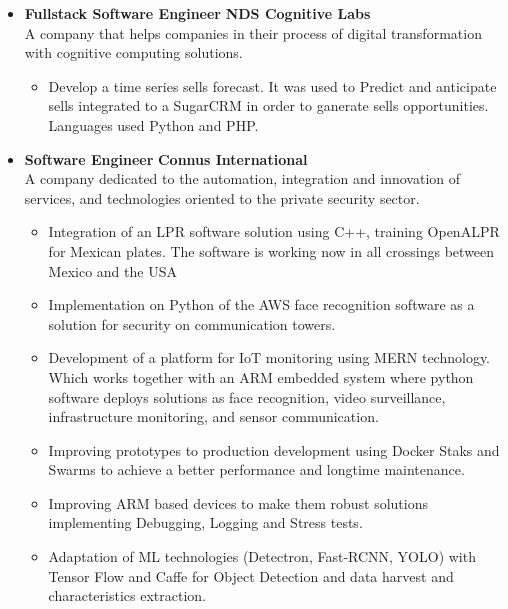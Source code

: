 \documentclass[]{friggeri-cv}
\renewenvironment{entrylist}{%
  \begin{itemize}[leftmargin=0.25in,align=left,itemindent=-\dimexpr\labelindent\relax]
}{%
  \end{itemize}
}
\renewcommand{\entry}[4]{%
  \item[#1] 
    \textbf{#2}%
    \hfill%
    {\footnotesize\textbf{\addfontfeature{Color=pblue} #3 }}\\%
    #4\vspace{\parsep}%
  }
\begin{document}
\begin{entrylist}

  \entry
    {09/18 - 02/19}
    {Fullstack Software Engineer}
    {NDS Cognitive Labs}
    {A company that helps companies in their process of digital transformation with cognitive computing solutions.\vspace{-1mm}
    \begin{itemize}[label=$•$]
    \addtolength{\itemindent}{-4mm}
    	\item Develop a time series sells forecast. It was used to Predict and anticipate sells integrated to a SugarCRM in order to ganerate sells opportunities. Languages used Python and PHP.
	\end{itemize}
    }


  \entry
    {03/17 - 09/18}
    {Software Engineer}
    {Connus International}
    {A company dedicated to the automation, integration and innovation of services, and technologies oriented to the private security sector.\vspace{-1mm}
    \begin{itemize}[label=$•$]
    \addtolength{\itemindent}{-4mm}
    	\item Integration of an LPR software solution using C++, training OpenALPR for Mexican plates. The software is working now in all crossings between Mexico and the USA
    	\item Implementation on Python of the AWS face recognition software as a solution for security on communication towers.
    	\item Development of a platform for IoT monitoring using MERN technology. Which works together with an ARM embedded system where python software deploys solutions as face recognition, video surveillance, infrastructure monitoring, and sensor communication.
		\item Improving prototypes to production development using Docker Staks and Swarms to achieve a better performance and longtime maintenance.
		\item Improving ARM based devices to make them robust solutions implementing Debugging, Logging and Stress tests.
		\item Adaptation of ML technologies (Detectron, Fast-RCNN, YOLO) with Tensor Flow  and Caffe for Object Detection and data harvest and characteristics extraction.
	\end{itemize}
    }

   

\end{entrylist}
\end{document}
